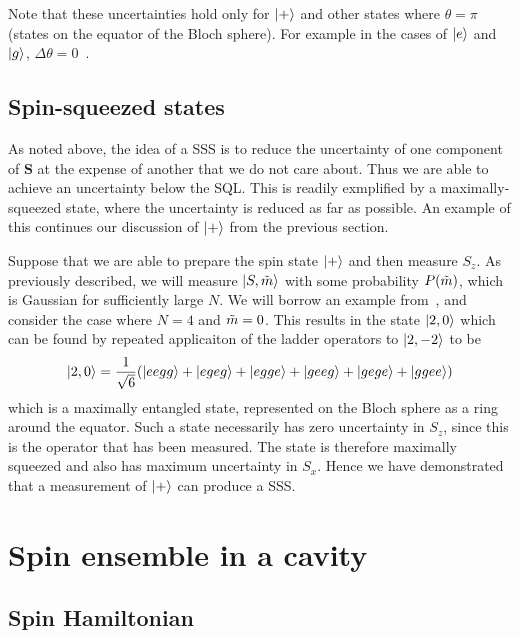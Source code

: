Note that these uncertainties hold only for $\ket{+}$ and other states where
$\theta = \pi$ (states on the equator of the Bloch sphere). For example in the
cases of $\ket{e}$ and $\ket{g}$, $\Delta \theta = 0$~\cite{PhysRevA.47.3554}.

\subsection{Spin-squeezed states}

As noted above, the idea of a SSS is to reduce the uncertainty of one component
of $\mathbf{S}$ at the expense of another that we do not care about. Thus we
are able to achieve an uncertainty below the SQL. This is readily exmplified by
a maximally-squeezed state, where the uncertainty is reduced as far as
possible. An example of this continues our discussion of $\ket{+}$ from the
previous section.

Suppose that we are able to prepare the spin state $\ket{+}$ and then measure
$S_z$. As previously described, we will measure $\ket{S, \tilde{m}}$ with some
probability $P(\tilde{m})$, which is Gaussian for sufficiently large $N$. We
will borrow an example from~, and consider the case where
$N=4$ and $\tilde{m}=0$. This results in the state $\ket{2, 0}$ which can be
found by repeated applicaiton of the ladder operators to $\ket{2,-2}$ to be
%
\begin{equation}
  \ket{2,0} = \frac{1}{\sqrt{6}}(\ket{eegg} + \ket{egeg} + \ket{egge} +
  \ket{geeg} + \ket{gege} + \ket{ggee})
\end{equation}
%
which is a maximally entangled state, represented on the Bloch sphere as a ring
around the equator.
%
Such a state necessarily has zero uncertainty in $S_z$, since this is the
operator that has been measured. The state is therefore maximally squeezed and
also has maximum uncertainty in $S_x$.
%
%
Hence we have demonstrated that a measurement of $\ket{+}$ can produce a SSS.


\section{Spin ensemble in a cavity}

\subsection{Spin Hamiltonian}

